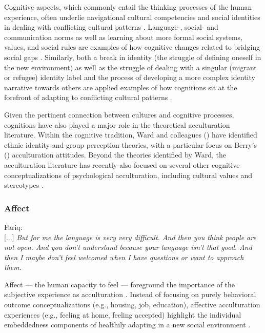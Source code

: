 \documentclass[man, 12pt, a4paper, mask]{apa7}
\begin{document}
Cognitive aspects, which commonly entail the thinking processes of the human experience, often underlie navigational cultural competencies and social identities in dealing with conflicting cultural patterns \citep[][]{Padilla2003}. Language-, social- and communication norms as well as learning about more formal social systems, values, and social rules are examples of how cognitive changes related to bridging social gaps \citep[e.g.,][]{Gelfand2011, Nisbett2002}. Similarly, both a break in identity (the struggle of defining oneself in the new environment) as well as the struggle of dealing with a singular (migrant or refugee) identity label and the process of developing a more complex identity narrative towards others are applied examples of how cognitions sit at the forefront of adapting to conflicting cultural patterns \citep[e.g.,][]{Verkuyten2012}.

Given the pertinent connection between cultures and cognitive processes, cognitions have also played a major role in the theoretical acculturation literature. Within the cognitive tradition, Ward and colleagues (\citeyear{Ward2001, Ward2019}) have identified ethnic identity and group perception theories, with a particular focus on Berry's (\citeyear{Berry1997b}) acculturation attitudes. Beyond the theories identified by Ward, the acculturation literature has recently also focused on several other cognitive conceptualizations of psychological acculturation, including cultural values \citep[e.g.,][]{Marin2003} and stereotypes \citep[e.g.,][]{Stanciu2018}. 

\subsubsection{Affect}
\begin{displayquote}
    Fariq:\\
    {[...]} \textit{But for me the language is very very difficult. And then you think people are not open. And you don't understand because your language isn't that good. And then I maybe don't feel welcomed when I have questions or want to approach them.}
\end{displayquote}

Affect --- the human capacity to feel \citep[including emotions and moods;][]{FeldmanBarrett2007} --- foreground the importance of the subjective experience as acculturation \citep[][]{Holodynski2012}. Instead of focusing on purely behavioral outcome conceptualizations (e.g., housing, job, education), affective acculturation experiences (e.g., feeling at home, feeling accepted) highlight the individual embeddedness components of healthily adapting in a new social environment \citep[][]{mesquita2016}. 
\end{document}
